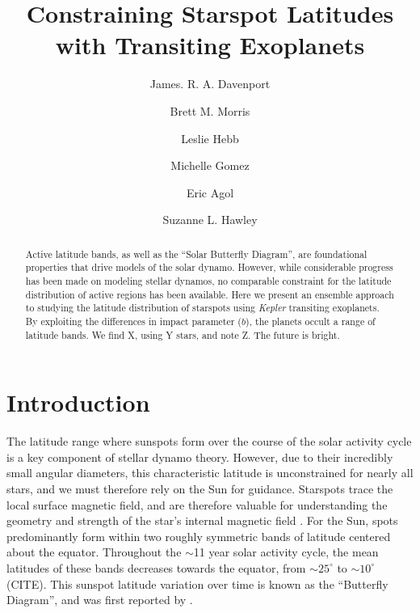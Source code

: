 \documentclass[preprint2]{aastex61}
\newcommand{\Kepler}{\textsl{Kepler}\xspace}
\begin{document}
\title{Constraining Starspot Latitudes with Transiting Exoplanets}



\author{James. R. A. Davenport}

\author{Brett M. Morris}

\author{Leslie Hebb}

\author{Michelle Gomez}

\author{Eric Agol}

\author{Suzanne L. Hawley}



\begin{abstract}
Active latitude bands, as well as the ``Solar Butterfly Diagram'', are foundational properties that drive models of the solar dynamo. However, while considerable progress has been made on modeling stellar dynamos, no comparable constraint for the latitude distribution of active regions has been available. Here we present an ensemble approach to studying the latitude distribution of starspots using \Kepler transiting exoplanets. By exploiting the differences in impact parameter ($b$), the planets occult a range of latitude bands. We find X, using Y stars, and note Z. The future is bright.
\end{abstract}



\section{Introduction}
\label{sec:intro}

The latitude range where sunspots form over the course of the solar activity cycle is a key component of stellar dynamo theory.
However, due to their incredibly small angular diameters, this characteristic latitude is  unconstrained for nearly all stars, and we must therefore rely on the Sun for guidance. Starspots trace the local surface magnetic field, and are therefore valuable for understanding the geometry and strength of the star's internal magnetic field \citep{berdyugina2005}.
For the Sun, spots predominantly form within two roughly symmetric bands of latitude centered about the equator. Throughout the $\sim$11 year solar activity cycle, the mean latitudes of these bands decreases towards the equator, from $\sim$$25^\circ$ to $\sim$$10^\circ$ (CITE). This sunspot latitude variation over time is known as the ``Butterfly Diagram'', and was first reported by \citet{maunder1904}.
\end{document}
